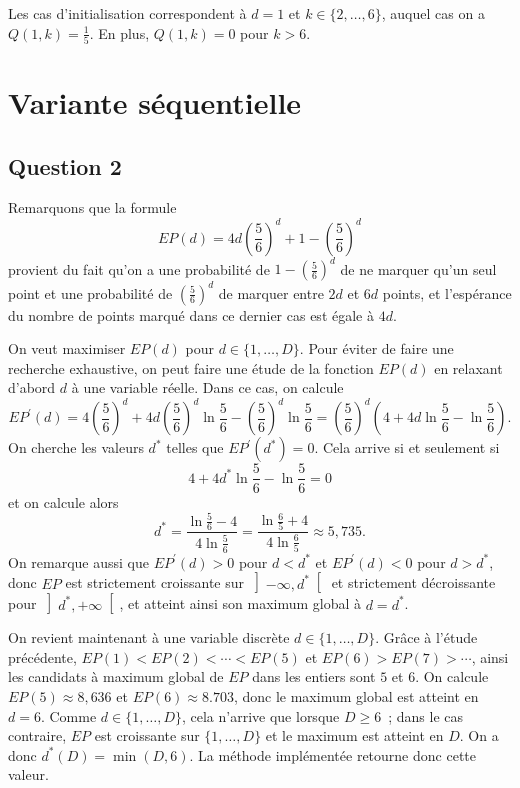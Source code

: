 \documentclass[a4paper,11pt]{amsart}
\theoremstyle{plain}
\begin{document}
Les cas d'initialisation correspondent à $d = 1$ et $k \in \{2, \dotsc, 6\}$, auquel cas on a $Q(1, k) = \frac{1}{5}$. En plus, $Q(1, k) = 0$ pour $k > 6$.

\section{Variante séquentielle}

\subsection{Question 2}

Remarquons que la formule 
\begin{equation}
\label{EPd}
EP(d) = 4 d \left(\frac{5}{6}\right)^d + 1 - \left(\frac{5}{6}\right)^d
\end{equation}
provient du fait qu'on a une probabilité de $1 - \left(\frac{5}{6}\right)^d$ de ne marquer qu'un seul point et une probabilité de $\left(\frac{5}{6}\right)^d$ de marquer entre $2d$ et $6d$ points, et l'espérance du nombre de points marqué dans ce dernier cas est égale à $4d$.

On veut maximiser $EP(d)$ pour $d \in \{1, \dotsc, D\}$. Pour éviter de faire une recherche exhaustive, on peut faire une étude de la fonction $EP(d)$ en relaxant d'abord $d$ à une variable réelle. Dans ce cas, on calcule
\[
EP^\prime(d) = 4 \left(\frac{5}{6}\right)^d + 4 d \left(\frac{5}{6}\right)^d \ln \frac{5}{6} - \left(\frac{5}{6}\right)^d \ln \frac{5}{6} = \left(\frac{5}{6}\right)^d \left(4 + 4 d \ln \frac{5}{6} - \ln\frac{5}{6}\right).
\]
On cherche les valeurs $d^\ast$ telles que $EP^\prime(d^\ast) = 0$. Cela arrive si et seulement si
\[
4 + 4 d^\ast \ln \frac{5}{6} - \ln\frac{5}{6} = 0
\]
et on calcule alors
\[
d^\ast = \frac{\ln \frac{5}{6} - 4}{4 \ln \frac{5}{6}} = \frac{\ln \frac{6}{5} + 4}{4 \ln \frac{6}{5}} \approx 5,735.
\]
On remarque aussi que $EP^\prime(d) > 0$ pour $d < d^\ast$ et $EP^\prime(d) < 0$ pour $d > d^\ast$, donc $EP$ est strictement croissante sur $\left]-\infty, d^\ast\right[$ et strictement décroissante pour $\left]d^\ast, +\infty\right[$, et atteint ainsi son maximum global à $d = d^\ast$.

On revient maintenant à une variable discrète $d \in \{1, \dotsc, D\}$. Grâce à l'étude précédente, $EP(1) < EP(2) < \dotsb <EP(5)$ et $EP(6) > EP(7) > \dotsb$, ainsi les candidats à maximum global de $EP$ dans les entiers sont $5$ et $6$. On calcule $EP(5) \approx 8,636$ et $EP(6) \approx 8.703$, donc le maximum global est atteint en $d = 6$. Comme $d \in \{1, \dotsc, D\}$, cela n'arrive que lorsque $D \geq 6$~; dans le cas contraire, $EP$ est croissante sur $\{1, \dotsc, D\}$ et le maximum est atteint en $D$. On a donc $d^\ast(D) = \min(D, 6)$. La méthode implémentée retourne donc cette valeur.
\end{document}
